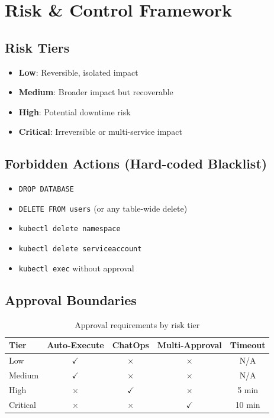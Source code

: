 \documentclass[11pt,a4paper]{article}
\begin{document}
\section{Risk \& Control Framework}

\subsection{Risk Tiers}
\begin{itemize}
    \item \textbf{Low}: Reversible, isolated impact
    \item \textbf{Medium}: Broader impact but recoverable
    \item \textbf{High}: Potential downtime risk
    \item \textbf{Critical}: Irreversible or multi-service impact
\end{itemize}

\subsection{Forbidden Actions (Hard-coded Blacklist)}
\begin{itemize}
    \item \texttt{DROP DATABASE}
    \item \texttt{DELETE FROM users} (or any table-wide delete)
    \item \texttt{kubectl delete namespace}
    \item \texttt{kubectl delete serviceaccount}
    \item \texttt{kubectl exec} without approval
\end{itemize}

\subsection{Approval Boundaries}

\begin{table}[h]
\centering
\begin{tabular}{@{}lcccc@{}}
\toprule
\textbf{Tier} & \textbf{Auto-Execute} & \textbf{ChatOps} & \textbf{Multi-Approval} & \textbf{Timeout} \\ \midrule
Low      & $\checkmark$ & $\times$ & $\times$ & N/A \\
Medium   & $\checkmark$ & $\times$ & $\times$ & N/A \\
High     & $\times$ & $\checkmark$ & $\times$ & 5 min \\
Critical & $\times$ & $\times$ & $\checkmark$ & 10 min \\ \bottomrule
\end{tabular}
\caption{Approval requirements by risk tier}
\end{table}
\end{document}
